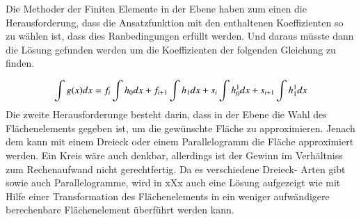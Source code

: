 


 




Die Methoder der Finiten Elemente in der Ebene haben zum einen die Herausforderung, dass die Ansatzfunktion mit den enthaltenen Koeffizienten so zu wählen ist, dass dies Ranbedingungen erfüllt werden.  Und daraus müsste dann die Lösung gefunden werden um die Koeffizienten der folgenden Gleichung zu finden.

\begin{equation}
\int g(x) \space dx = f_i \int h_0 \space dx+ f_{i+1}\int h_1 \space dx + s_i\int h_0^1 dx + s_{i+1}\int h_1^1 dx
\label{fem:equation5}
\end{equation}
Die zweite Herausforderunge besteht darin, dass in der Ebene die Wahl des Flächenelements gegeben ist, um die gewünschte Fläche zu approximieren. Jenach dem kann mit einem Dreieck oder einem Parallelogramm die Fläche approximiert werden. Ein Kreis wäre auch denkbar, allerdings ist der Gewinn im Verhältniss zum Rechenaufwand nicht gerechtfertig. Da es verschiedene Dreieck- Arten gibt sowie auch Parallelogramme, wird in xXx auch eine Lösung aufgezeigt wie mit Hilfe einer Transformation des Flächenelements in ein weniger aufwändigere berechenbare Flächenelement überführt werden kann.





